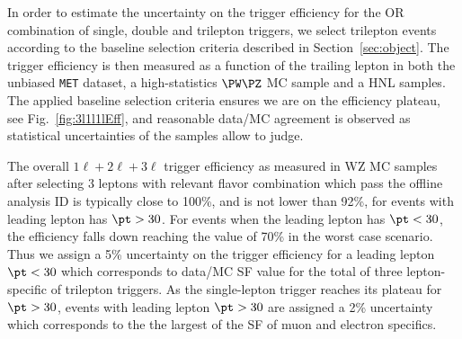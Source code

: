 In order to estimate the uncertainty on the trigger efficiency for the OR combination of single, double and trilepton triggers,
we select trilepton events according to the baseline selection criteria described in Section~\ref{sec:object}.
The trigger efficiency is then measured as a function of the trailing
lepton \pt in both the unbiased \verb!MET! dataset, a high-statistics $\PW\PZ$ MC sample and a HNL samples. 
The applied baseline selection criteria
ensures we are on the efficiency plateau, see Fig.~\ref{fig:3l1l1lEff}, and reasonable data/MC agreement is observed 
as statistical uncertainties of the samples allow to judge.

The overall $1\ell+2\ell+3\ell$ trigger efficiency as measured in WZ MC samples 
after selecting 3 leptons with relevant flavor combination which pass
the offline analysis ID is typically close to 100\%, and is not lower
than 92\%, for events with leading lepton has $\pt > 30$\GeV. For
events when the leading lepton has $\pt < 30$\GeV, the efficiency
falls down reaching the value of 70\% in the worst case scenario.
Thus we assign a 5\% uncertainty
on the trigger efficiency for a leading lepton $\pt < 30$\GeV $\;$which corresponds to data/MC SF value 
for the total of three lepton-specific of trilepton triggers.
As the single-lepton trigger reaches its plateau for $\pt > 30$\GeV,
events with leading lepton $\pt > 30$\GeV$\;$are assigned a 2\%
uncertainty which corresponds to the the largest of the SF of muon and electron specifics. 


